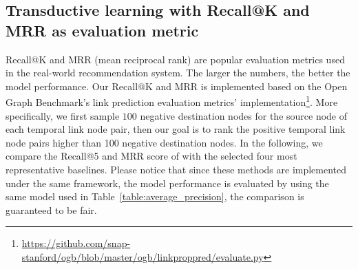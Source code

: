 \subsection{Transductive learning with Recall@K and MRR as evaluation metric}
Recall@K and MRR (mean reciprocal rank) are popular evaluation metrics used in the real-world recommendation system. The larger the numbers, the better the model performance.
Our Recall@K and MRR is implemented based on the Open Graph Benchmark's link prediction evaluation metrics' implementation\footnote{\url{https://github.com/snap-stanford/ogb/blob/master/ogb/linkproppred/evaluate.py}}. More specifically, we first sample $100$ negative destination nodes for the source node of each temporal link node pair, then our goal is to rank the positive temporal link node pairs higher than 100 negative destination nodes.
In the following, we compare the Recall@5 and MRR score of \our with the selected four most representative baselines.
Please notice that since these methods are implemented under the same framework, the model performance is evaluated by using the same model used in Table~\ref{table:average_precision}, the comparison is guaranteed to be fair.

\begin{table}[h]
\caption{Comparison on the Recall@K and MRR.}
\label{table:recall_mrr}
\vspace{-3mm}
\centering
{}
\end{table}

